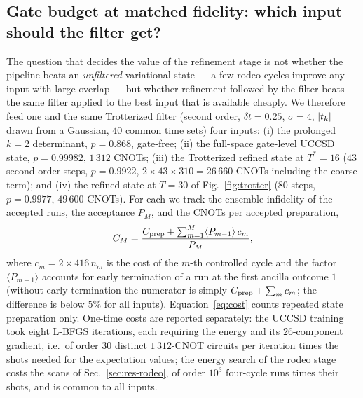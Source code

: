 \documentclass[
  aps,            %
  prc,            %
  reprint,        %
  superscriptaddress,
  floatfix,
  nofootinbib
]{revtex4-2}
\begin{document}
\subsection{Gate budget at matched fidelity: which input should the filter get?}
\label{sec:depth}
The question that decides the value of the refinement stage is not whether the
pipeline beats an \emph{unfiltered} variational state --- a few rodeo cycles
improve any input with large overlap --- but whether refinement followed by the
filter beats the same filter applied to the best input that is available
cheaply.  We therefore feed one and the same Trotterized filter (second order,
$\delta t=0.25$, $\sigma=4$, $\abs{t_k}$ drawn from a Gaussian, $40$ common time
sets) four inputs: (i) the prolonged $k=2$ determinant, $p=0.868$, gate-free;
(ii) the full-space gate-level UCCSD state, $p=0.99982$, $1\,312$ CNOTs;
(iii) the Trotterized refined state at $T^{*}=16$ ($43$ second-order steps,
$p=0.9922$, $2\times43\times310=26\,660$ CNOTs including the coarse term); and
(iv) the refined state at $T=30$ of Fig.~\ref{fig:trotter} ($80$ steps,
$p=0.9977$, $49\,600$ CNOTs).  For each we track the ensemble infidelity of the
accepted runs, the acceptance $P_M$, and the CNOTs per accepted preparation,
\begin{equation}
  C_M=\frac{C_{\rm prep}+\sum_{m=1}^{M}\langle P_{m-1}\rangle\,c_m}{P_M},
  \label{eq:cost}
\end{equation}
where $c_m=2\times416\,n_m$ is the cost of the $m$-th controlled cycle and the
factor $\langle P_{m-1}\rangle$ accounts for early termination of a run at the
first ancilla outcome $1$ (without early termination the numerator is simply
$C_{\rm prep}+\sum_m c_m$; the difference is below $5\%$ for all inputs).
Equation~\eqref{eq:cost} counts repeated state preparation only.  One-time
costs are reported separately: the UCCSD training took eight L-BFGS iterations,
each requiring the energy and its $26$-component gradient, i.e.\ of order $30$
distinct $1\,312$-CNOT circuits per iteration times the shots needed for the
expectation values; the energy search of the rodeo stage costs the scans of
Sec.~\ref{sec:res-rodeo}, of order $10^{3}$ four-cycle runs times their shots,
and is common to all inputs.
\end{document}
